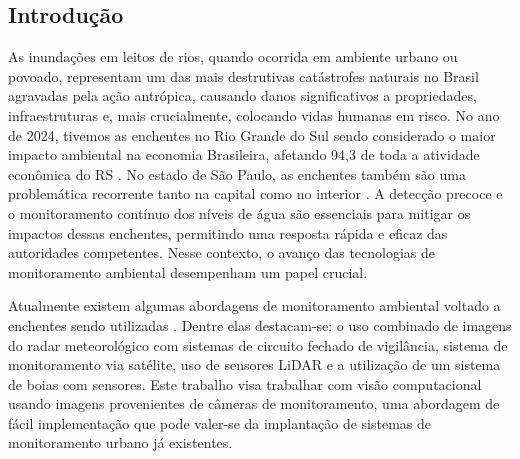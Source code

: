 \documentclass[12pt]{article}
\begin{document}
\newpage
\thispagestyle{empty}
\begin{spacing}{1}

\newpage

\tableofcontents

\newpage



\setcounter{page}{1} 

\section{Introdução}

As inundações em leitos de rios, quando ocorrida em ambiente urbano ou povoado, representam um das mais destrutivas catástrofes naturais no Brasil agravadas pela ação antrópica, causando danos significativos a propriedades, infraestruturas e, mais crucialmente, colocando vidas humanas em risco. No ano de 2024, tivemos as enchentes no Rio Grande do Sul sendo considerado o maior impacto ambiental na economia Brasileira, afetando 94,3 de toda a atividade econômica do RS \cite{label1}. No estado de São Paulo, as enchentes também são uma problemática recorrente tanto na capital como no interior \cite{label2}. A detecção precoce e o monitoramento contínuo dos níveis de água são essenciais para mitigar os impactos dessas enchentes, permitindo uma resposta rápida e eficaz das autoridades competentes. Nesse contexto, o avanço das tecnologias de monitoramento ambiental desempenham um papel crucial.

Atualmente existem algumas abordagens de monitoramento ambiental voltado a enchentes sendo utilizadas \cite{barizao2023inovaccoes}. Dentre elas destacam-se: o uso combinado de imagens do radar meteorológico com sistemas de circuito fechado de vigilância, sistema de monitoramento via satélite, uso de sensores LiDAR e a utilização de um sistema de boias com sensores. Este trabalho visa trabalhar com visão computacional~\cite{iqbal2021computer} usando imagens provenientes de câmeras de monitoramento, uma abordagem de fácil implementação que pode valer-se da implantação de sistemas de monitoramento urbano já existentes.


\end{spacing}
\end{document}
